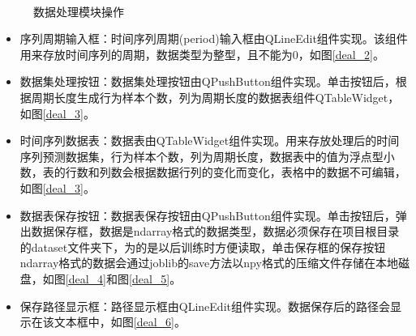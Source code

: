 \documentclass[cn,11pt,chinese]{elegantbook}
\begin{document}
\begin{figure}
{	}
	\\
	\caption{数据处理模块操作}
	\label{deal}
\end{figure}

\begin{itemize}
	\item 序列周期输入框：时间序列周期(period)输入框由QLineEdit组件实现。该组件用来存放时间序列的周期，数据类型为整型，且不能为0，如图\ref{deal_2}。
	\item 数据集处理按钮：数据集处理按钮由QPushButton组件实现。单击按钮后，根据周期长度生成行为样本个数，列为周期长度的数据表组件QTableWidget，如图\ref{deal_3}。
	\item 时间序列数据表：数据表由QTableWidget组件实现。用来存放处理后的时间序列预测数据集，行为样本个数，列为周期长度，数据表中的值为浮点型小数，表的行数和列数会根据数据行列的变化而变化，表格中的数据不可编辑，如图\ref{deal_3}。
	\item 数据表保存按钮：数据表保存按钮由QPushButton组件实现。单击按钮后，弹出数据保存框，数据是ndarray格式的数据类型，数据必须保存在项目根目录的dataset文件夹下，为的是以后训练时方便读取，单击保存框的保存按钮ndarray格式的数据会通过joblib的save方法以npy格式的压缩文件存储在本地磁盘，如图\ref{deal_4}和图\ref{deal_5}。
	\item 保存路径显示框：路径显示框由QLineEdit组件实现。数据保存后的路径会显示在该文本框中，如图\ref{deal_6}。
\end{itemize}
\end{document}
